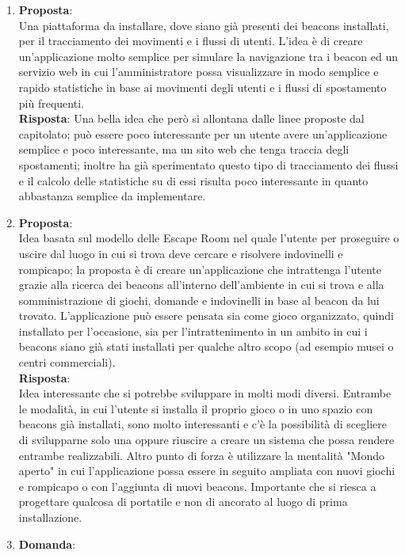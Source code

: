 \documentclass[a4paper,titlepage]{article}
\begin{document}
\begin{enumerate}
  \item \textbf{Proposta}: \\
  Una piattaforma da installare, dove siano già presenti dei beacons installati, per il tracciamento dei movimenti e i flussi di utenti. L'idea è di creare un'applicazione molto semplice per simulare la navigazione tra i beacon ed un servizio web in cui l'amministratore possa visualizzare in modo semplice e rapido statistiche in base ai movimenti degli utenti e i flussi di spostamento più frequenti. \\
  \textbf{Risposta}:
  Una bella idea che però si allontana dalle linee proposte dal capitolato; 
  può essere poco interessante per un utente avere un'applicazione semplice e poco interessante, ma un sito web che tenga traccia degli spostamenti; inoltre \PROPONENTE{} ha già sperimentato questo tipo di tracciamento dei flussi e il calcolo delle statistiche su di essi risulta poco interessante in quanto abbastanza semplice da implementare.
  \item \textbf{Proposta}: \\
  Idea basata sul modello delle Escape Room nel quale l'utente per proseguire o uscire dal luogo in cui si trova deve cercare e risolvere indovinelli e rompicapo; la proposta è di creare un'applicazione che intrattenga l'utente grazie alla ricerca dei beacons all'interno dell'ambiente in cui si trova e alla somministrazione di giochi, domande e indovinelli in base al beacon da lui trovato. L'applicazione può essere pensata sia come gioco organizzato, quindi installato per l'occasione, sia per l'intrattenimento in un ambito in cui i beacons siano già stati installati per qualche altro scopo (ad esempio musei o centri commerciali).\\
  \textbf{Risposta}: \\
  Idea interessante che si potrebbe sviluppare in molti modi diversi. Entrambe le modalità, in cui l'utente si installa il proprio gioco o in uno spazio con beacons già installati, sono molto interessanti e c'è la possibilità di scegliere di svilupparne solo una oppure riuscire a creare un sistema che possa rendere entrambe realizzabili. Altro punto di forza è utilizzare la mentalità "Mondo aperto" in cui l'applicazione possa essere in seguito ampliata con nuovi giochi e rompicapo o con l'aggiunta di nuovi beacons. Importante che si riesca a progettare qualcosa di portatile e non di ancorato al luogo di prima installazione.
  \item \textbf{Domanda}:\\

\end{enumerate}
\end{document}
